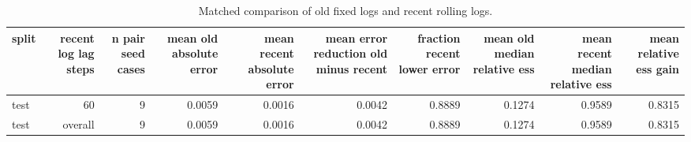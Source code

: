 \begin{table}[t]
\centering
\small
\caption{Matched comparison of old fixed logs and recent rolling logs.}
\label{tab:fixed\_vs\_rolling}
\begin{tabular}{lrrrrrrrrr}
\toprule
split & recent log lag steps & n pair seed cases & mean old absolute error & mean recent absolute error & mean error reduction old minus recent & fraction recent lower error & mean old median relative ess & mean recent median relative ess & mean relative ess gain \\
\midrule
test & 60 & 9 & 0.0059 & 0.0016 & 0.0042 & 0.8889 & 0.1274 & 0.9589 & 0.8315 \\
test & overall & 9 & 0.0059 & 0.0016 & 0.0042 & 0.8889 & 0.1274 & 0.9589 & 0.8315 \\
\bottomrule
\end{tabular}
\end{table}
